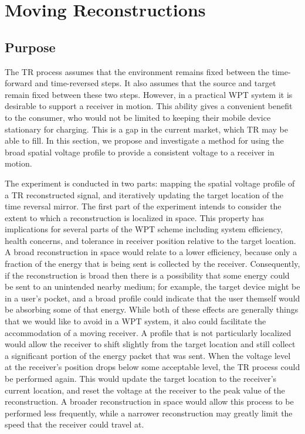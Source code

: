 \section{Moving Reconstructions}
\label{sec:moving}

\subsection{Purpose}
The TR process assumes that the environment remains fixed between the time-forward and time-reversed steps. It also assumes that the source and target remain fixed between these two steps. However, in a practical WPT system it is desirable to support a receiver in motion. This ability gives a convenient benefit to the consumer, who would not be limited to keeping their mobile device stationary for charging. This is a gap in the current market, which TR may be able to fill. In this section, we propose and investigate a method for using the broad spatial voltage profile to provide a consistent voltage to a receiver in motion.

The experiment is conducted in two parts: mapping the spatial voltage profile of a TR reconstructed signal, and iteratively updating the target location of the time reversal mirror. The first part of the experiment intends to consider the extent to which a reconstruction is localized in space. This property has implications for several parts of the WPT scheme including system efficiency, health concerns, and tolerance in receiver position relative to the target location. A broad reconstruction in space would relate to a lower efficiency, because only a fraction of the energy that is being sent is collected by the receiver. Consequently, if the reconstruction is broad then there is a possibility that some energy could be sent to an unintended nearby medium; for example, the target device might be in a user's pocket, and a broad profile could indicate that the user themself would be absorbing some of that energy. While both of these effects are generally things that we would like to avoid in a WPT system, it also could facilitate the accommodation of a moving receiver. A profile that is not particularly localized would allow the receiver to shift slightly from the target location and still collect a significant portion of the energy packet that was sent. When the voltage level at the receiver's position drops below some acceptable level, the TR process could be performed again. This would update the target location to the receiver's current location, and reset the voltage at the receiver to the peak value of the reconstruction. A broader reconstruction in space would allow this process to be performed less frequently, while a narrower reconstruction may greatly limit the speed that the receiver could travel at.

